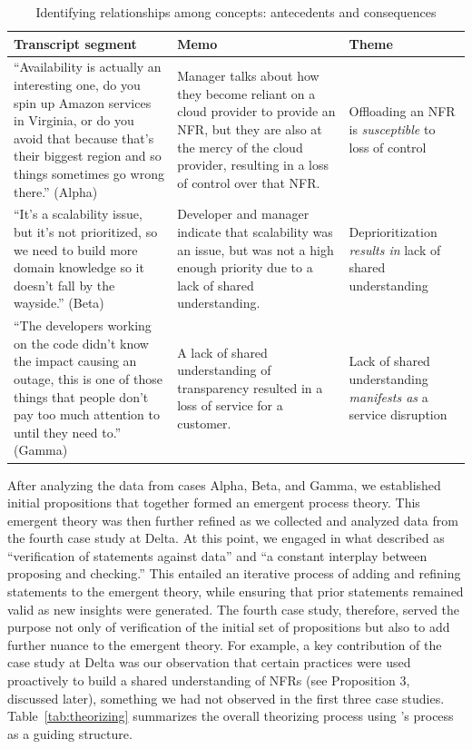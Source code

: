 \documentclass[smallextended]{svjour3}       %
\begin{document}
\begin{table}[!ht]
\caption{Identifying relationships among concepts: antecedents and consequences}
\label{tab:samplecode}
\footnotesize 
    \begin{tabular}{p{4cm}p{4cm}p{3cm}}
    \toprule
    Transcript segment & Memo & Theme \\ \midrule


    ``Availability is actually an interesting one, do you spin up Amazon services in Virginia, or do you avoid that because that's their biggest region and so things sometimes go wrong there.'' (Alpha) 
& Manager talks about how they become reliant on a cloud provider to provide an NFR, but they are also at the mercy of the cloud provider, resulting in a loss of control over that NFR. &  Offloading an NFR is \emph{susceptible} to loss of control \\
    \addlinespace
    

    ``It's a scalability issue, but it's not prioritized, so we need to build more domain knowledge so it doesn't fall by the wayside.'' (Beta) & Developer and manager indicate that scalability was an issue, but was not a high enough priority due to a lack of shared understanding. & Deprioritization \emph{results in} lack of shared understanding \\
    \addlinespace

    ``The developers working on the code didn't know the impact causing an outage, this is one of those things that people don't pay too much attention to until they need to.'' (Gamma) & A lack of shared understanding of transparency resulted in a loss of service for a customer. & Lack of shared understanding \emph{manifests as} a service disruption \\    
    
    \bottomrule
    \end{tabular}
\end{table}

After analyzing the data from cases Alpha, Beta, and Gamma, we established initial propositions that together formed an emergent process theory. This emergent theory was then further refined as we collected and analyzed data from the fourth case study at Delta. At this point, we engaged in what \citet[p. 108-111]{strauss1990basics} described as ``verification of statements against data'' and ``a constant interplay between proposing and checking.''
This entailed an iterative process of adding and refining statements to the emergent theory, while ensuring that prior statements remained valid as new insights were generated. 
The fourth case study, therefore, served the purpose not only of verification of the initial set of propositions but also to add further nuance to the emergent theory. For example, a key contribution of the case study at Delta was our observation that certain practices were used proactively to build a shared understanding of NFRs (see Proposition 3, discussed later), something we had not observed in the first three case studies.
Table~\ref{tab:theorizing} summarizes the overall theorizing process using \citet{eisenhardt1989building}'s process as a guiding structure. 
\end{document}
